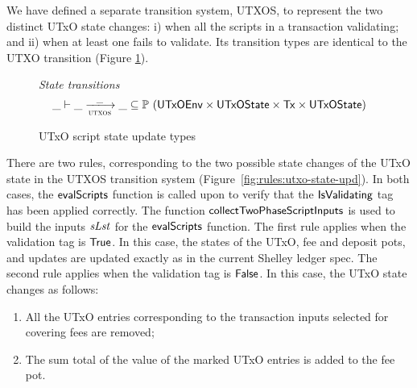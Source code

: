 We have defined a separate transition system, UTXOS, to represent the two distinct
UTxO state changes: i) when all the scripts in a transaction validating; and
ii) when at least one fails to validate. Its transition types
are identical to the UTXO transition (Figure
\ref{fig:ts-types:utxo-scripts}).

\begin{figure}[htb]
  \emph{State transitions}
  \begin{equation*}
    \_ \vdash
    \var{\_} \trans{utxos}{\_} \var{\_}
    \subseteq \powerset (\UTxOEnv \times \UTxOState \times \Tx \times \UTxOState)
  \end{equation*}
  \caption{UTxO script state update types}
  \label{fig:ts-types:utxo-scripts}
\end{figure}

There are two rules, corresponding to the two possible state changes of the
UTxO state in the UTXOS transition system (Figure~\ref{fig:rules:utxo-state-upd}).
%
In both cases, the $\mathsf{evalScripts}$ function is called upon to verify that the $\mathsf{IsValidating}$
tag has been applied correctly. The function $\mathsf{collectTwoPhaseScriptInputs}$ is used to build
the inputs $\mathit{sLst}$ for the $\mathsf{evalScripts}$ function.
%
The first rule
applies when the validation tag is $\mathsf{True}$.
In this case, the states of the UTxO, fee
  and deposit pots, and updates are updated exactly as in the current Shelley
  ledger spec.
%
  The second rule
  applies when the validation tag is $\mathsf{False}$.
  In this case, the UTxO state changes as follows:

  \begin{enumerate}
    \item All the
    UTxO entries corresponding to the transaction inputs selected for covering
    fees are removed;

    \item The sum total of the value of the marked UTxO entries
    is added to the fee pot.
  \end{enumerate}


